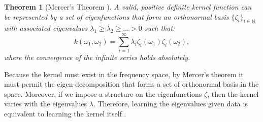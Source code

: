 \documentclass[sigconf,anonymous,review]{acmart}
\newtheorem{myTheo}{\textbf{Theorem}}
\begin{document}
{\begin{myTheo}[Mercer's Theorem \citep{mercer1909mercer}]\label{thm:mercer}
A valid, positive definite kernel function can be represented
by a set of eigenfunctions that form an orthonormal basis $\{\zeta_i\}_{i\in\mathbb{N}}$ with associated eigenvalues $\lambda_1 \geq \lambda_2 \geq \dots > 0$ such that:
\begin{equation}
    k(\omega_1,\omega_2) = \sum_{i=1}^{\infty} \lambda_i \zeta_i(\omega_1) \zeta_i(\omega_2),
\end{equation}
where the convergence of the infinite series holds absolutely.
\end{myTheo}
Because the kernel must exist in the frequency space, by Mercer's theorem it must permit the eigen-decomposition that forms a set of orthonormal basis in the space.
Moreover, if we impose a structure on the eigenfunctions $\zeta$, then the kernel varies with the eigenvalues $\lambda$.
Therefore, learning the eigenvalues given data is equivalent to learning the kernel itself \citep{wilson2016deepkernel}.

}
\end{document}

